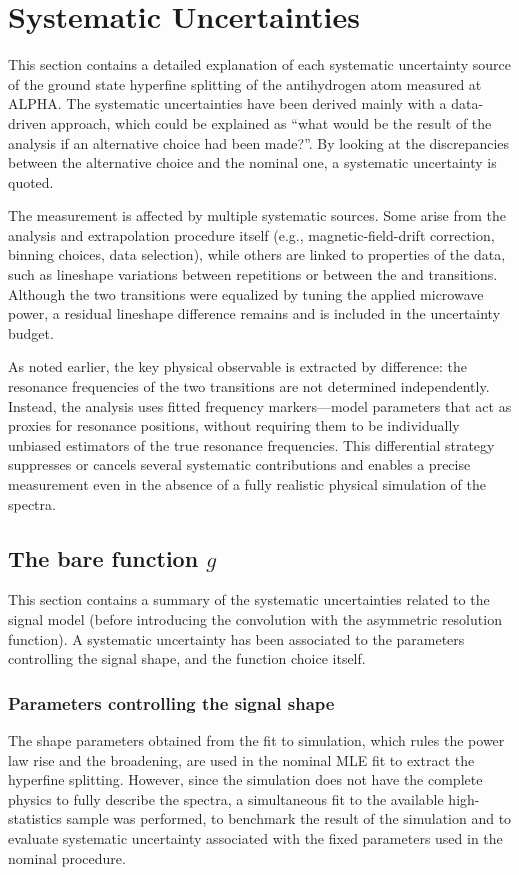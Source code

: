\section{Systematic Uncertainties}

This section contains a detailed explanation of each systematic uncertainty source of the ground state hyperfine splitting of the antihydrogen atom measured at ALPHA.
The systematic uncertainties have been derived mainly with a data-driven approach, which could be explained as ``what would be the result of the analysis if an alternative choice had been made?''. By looking at the discrepancies between the alternative choice and the nominal one, a systematic uncertainty is quoted. 

The measurement is affected by multiple systematic sources. Some arise from the analysis and extrapolation procedure itself (e.g., magnetic-field-drift correction, binning choices, data selection), while others are linked to properties of the data, such as lineshape variations between repetitions or between the \cb and \da transitions. Although the two transitions were equalized by tuning the applied microwave power, a residual lineshape difference remains and is included in the uncertainty budget.

As noted earlier, the key physical observable is extracted by difference: the resonance frequencies of the two transitions are not determined independently. Instead, the analysis uses fitted frequency markers—model parameters that act as proxies for resonance positions, without requiring them to be individually unbiased estimators of the true resonance frequencies. This differential strategy suppresses or cancels several systematic contributions and enables a precise measurement even in the absence of a fully realistic physical simulation of the spectra.

\subsection{The bare function \texorpdfstring{$g$}{g}}

This section contains a summary of the systematic uncertainties related to the signal model (before introducing the convolution with the asymmetric resolution function). A systematic uncertainty has been associated to the parameters controlling the signal shape, and the function choice itself.

\subsubsection{Parameters controlling the signal shape}
The shape parameters obtained from the fit to simulation, which rules the power law rise and the broadening, are used in the nominal MLE fit to extract the hyperfine splitting. However, since the simulation does not have the complete physics to fully describe the spectra, a simultaneous fit to the available high-statistics sample was performed, to benchmark the result of the simulation and to evaluate systematic uncertainty associated with the fixed parameters used in the nominal procedure.


